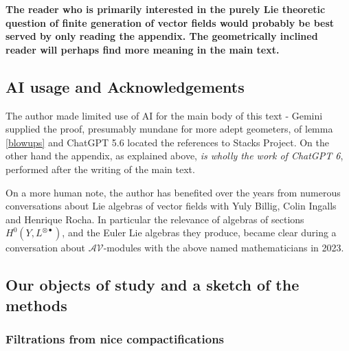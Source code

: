 \documentclass[12pt, oneside]{amsart}       %
\theoremstyle{remark}
\begin{document}
 \textbf{The reader who is primarily interested in the purely Lie theoretic question of finite generation of vector fields would probably be best served by only reading the appendix. The geometrically inclined reader will perhaps find more meaning in the main text.}

\subsection{AI usage and Acknowledgements} The author made limited use of AI for the main body of this text - Gemini supplied the proof, presumably mundane for more adept geometers, of lemma \ref{blowups} and ChatGPT 5.6 located the references to Stacks Project. On the other hand the appendix, as explained above, \emph{is wholly the work of ChatGPT 6}, performed after the writing of the main text. 

On a more human note, the author has benefited over the years from numerous conversations about Lie algebras of vector fields with Yuly Billig, Colin Ingalls and Henrique Rocha. In particular the relevance of algebras of sections $H^0(Y,L^{\otimes\bullet})$, and the Euler Lie algebras they produce, became clear during a conversation about $\mathcal{AV}$-modules with the above named mathematicians in 2023. 








\subsection{Our objects of study and a sketch of the methods} \subsubsection{Filtrations from nice compactifications}\label{sketch}
\end{document}

